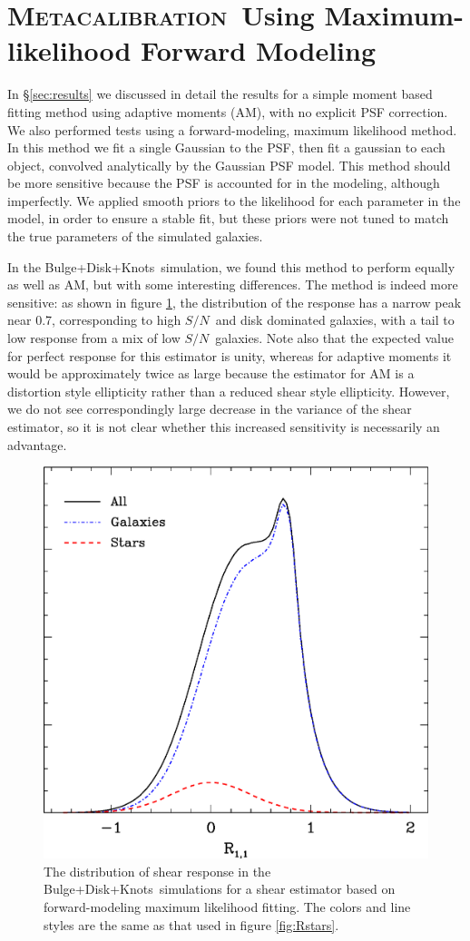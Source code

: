 \documentclass[iop]{emulateapj}
\newcommand{\snr}{$S/N$}
\newcommand{\Mcal}{\textsc{Metacalibration}}
\newcommand{\bdkfull}{Bulge+Disk+Knots}
\begin{document}
\section{\Mcal\ Using Maximum-likelihood Forward Modeling} \label{app:maxlike}

In \S \ref{sec:results} we discussed in detail the results for a simple moment
based fitting method using adaptive moments (AM), with no explicit PSF
correction.  We also performed tests using a forward-modeling, maximum
likelihood method.  In this method we fit a single Gaussian to the PSF, then
fit a gaussian to each object, convolved analytically by the Gaussian PSF
model.  This method should be more sensitive because the PSF is accounted for
in the modeling, although imperfectly.  We applied smooth priors to the
likelihood for each parameter in the model, in order to ensure a stable fit,
but these priors were not tuned to match the true parameters of the simulated
galaxies.

In the \bdkfull\ simulation, we found this method to perform equally as well as
AM, but with some interesting differences.  The method is indeed more
sensitive: as shown in figure \ref{fig:Rmaxlike}, the distribution of the
response has a narrow peak near 0.7, corresponding to high \snr\ and disk
dominated galaxies, with a tail to low response from a mix of low \snr\
galaxies.  Note also that the expected value for perfect response for this
estimator is unity, whereas for adaptive moments it would be approximately
twice as large because the estimator for AM is a distortion style ellipticity
rather than a reduced shear style ellipticity.  However,  we do not see
correspondingly large decrease in the variance of the shear estimator, so it is
not clear whether this increased sensitivity is necessarily an advantage.

\begin{figure}[h]
	\centering
    \includegraphics[width=0.5\columnwidth]{R-bd29-bd29stars.eps}

    \caption{The distribution of shear response in the \bdkfull\ simulations
    for a shear estimator based on  forward-modeling maximum likelihood fitting.
    The colors and line styles are the same as that used 
    in figure \ref{fig:Rstars}.}

\label{fig:Rmaxlike}
\end{figure}
\end{document}
